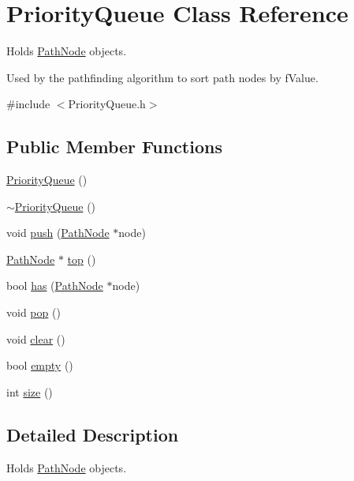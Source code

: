 \hypertarget{classPriorityQueue}{\section{Priority\-Queue Class Reference}
\label{classPriorityQueue}
}


Holds \hyperlink{structPathNode}{Path\-Node} objects.

Used by the pathfinding algorithm to sort path nodes by f\-Value.  




{\ttfamily \#include $<$Priority\-Queue.\-h$>$}

\subsection*{Public Member Functions}
\begin{DoxyCompactItemize}
\item 
\hyperlink{classPriorityQueue_a43c56db471bb26fc2ae0f2ad90d81256}{Priority\-Queue} ()
\item 
\hyperlink{classPriorityQueue_a69b8f6b5ad108e9db66ac4db46c628d7}{$\sim$\-Priority\-Queue} ()
\item 
void \hyperlink{classPriorityQueue_ac4b66b5e38519272280b7c642b6e33cd}{push} (\hyperlink{structPathNode}{Path\-Node} $\ast$node)
\item 
\hyperlink{structPathNode}{Path\-Node} $\ast$ \hyperlink{classPriorityQueue_a6a32975106abaadce005966e21fa088d}{top} ()
\item 
bool \hyperlink{classPriorityQueue_ad3a482624abc3d4a87f74b1404ff201a}{has} (\hyperlink{structPathNode}{Path\-Node} $\ast$node)
\item 
void \hyperlink{classPriorityQueue_a9395579e928d279a1fc7c9302a130a29}{pop} ()
\item 
void \hyperlink{classPriorityQueue_a1d25b05db6d11496d3923fbf0d5d9acd}{clear} ()
\item 
bool \hyperlink{classPriorityQueue_a39f863f0a358df2a14a6388f3e347010}{empty} ()
\item 
int \hyperlink{classPriorityQueue_a9e739f490c722aa98a7d7560d46b8a51}{size} ()
\end{DoxyCompactItemize}


\subsection{Detailed Description}
Holds \hyperlink{structPathNode}{Path\-Node} objects.

